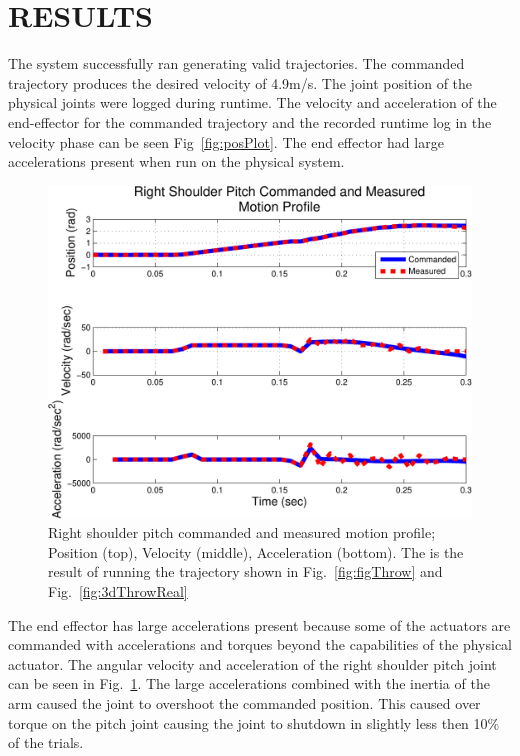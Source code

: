 \section{RESULTS}
The system successfully ran generating valid trajectories.    The commanded trajectory produces the desired velocity of 4.9m/s.  The joint position of the physical joints were logged during runtime.  The velocity and acceleration of the end-effector for the commanded trajectory and the recorded runtime log in the velocity phase can be seen Fig~\ref{fig:posPlot}.  The end effector had large accelerations present when run on the physical system.  

\begin{figure}[thpb]\label{fig:velosPlot}
  \centering
\includegraphics[width=1.0\columnwidth]{./MATLAB/throwTrajRSPplot.pdf}
  \caption{Right shoulder pitch commanded and measured motion profile; Position (top), Velocity (middle), Acceleration (bottom).  The is the result of running the trajectory shown in Fig.~\ref{fig:figThrow} and Fig.~\ref{fig:3dThrowReal}}
\end{figure}


The end effector has large accelerations present because some of the actuators are commanded with accelerations and torques beyond the capabilities of the physical actuator.  The angular velocity and acceleration of the right shoulder pitch joint can be seen in Fig.~\ref{fig:velosPlot}.  The large accelerations combined with the inertia of the arm caused the joint to overshoot the commanded position.  This caused over torque on the pitch joint causing the joint to shutdown in slightly less then 10\% of the trials.



